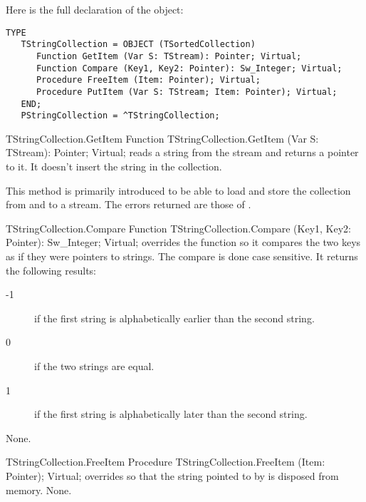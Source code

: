 Here is the full declaration of the  object:
\begin{verbatim}
TYPE
   TStringCollection = OBJECT (TSortedCollection)
      Function GetItem (Var S: TStream): Pointer; Virtual;
      Function Compare (Key1, Key2: Pointer): Sw_Integer; Virtual;
      Procedure FreeItem (Item: Pointer); Virtual;
      Procedure PutItem (Var S: TStream; Item: Pointer); Virtual;
   END;
   PStringCollection = ^TStringCollection;
\end{verbatim}


\begin{function}{TStringCollection.GetItem}
\Declaration
Function TStringCollection.GetItem (Var S: TStream): Pointer; Virtual;
\Description
{} reads a string from the stream  and returns a pointer 
to it. It doesn't insert the string in the collection.

This method is primarily introduced to be able to load and store the
collection from and to a stream.
\Errors
The errors returned are those of .
\SeeAlso
{}
\end{function}

\begin{function}{TStringCollection.Compare}
\Declaration
Function TStringCollection.Compare (Key1, Key2: Pointer): Sw\_Integer; Virtual;
\Description
{} overrides the  function so it compares 
the two keys as if they were pointers to strings. The compare is done case
sensitive. It returns the following results:
\begin{description}
\item[-1] if the first string is alphabetically earlier  than the second
string.
\item[0] if the two strings are equal.
\item[1] if the first string is alphabetically later than the second string.
\end{description}
\Errors
None.
\SeeAlso
{}
\end{function}

\begin{procedure}{TStringCollection.FreeItem}
\Declaration
Procedure TStringCollection.FreeItem (Item: Pointer); Virtual;
\Description
{} overrides  so that the string pointed
to by  is disposed from memory.
\Errors
None.
\SeeAlso
{}
\end{procedure}

